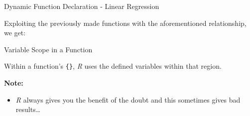 \begin{frame}[fragile]{Dynamic Function Declaration - Linear Regression}

Exploiting the previously made functions with the aforementioned
relationship, we get:

\begin{Shaded}
\begin{Highlighting}[]
\StringTok{ }
  \StringTok{ }
  \StringTok{ }
  \StringTok{ }\StringTok{ }
\NormalTok{\}}
\end{Highlighting}
\end{Shaded}

\end{frame}

\begin{frame}[fragile]{Variable Scope in a Function}

Within a function's \texttt{\{\}}, \emph{R} uses the defined variables
within that region.

\begin{Shaded}
\begin{Highlighting}[]
\StringTok{ }
  \StringTok{ }
\NormalTok{\}}

\NormalTok{(}\NormalTok{)}
\end{Highlighting}
\end{Shaded}

\textbf{Note:}

\begin{itemize}
\tightlist
\item
  \emph{R} always gives you the benefit of the doubt and this sometimes
  gives bad results\ldots{}
\end{itemize}

\end{frame}

